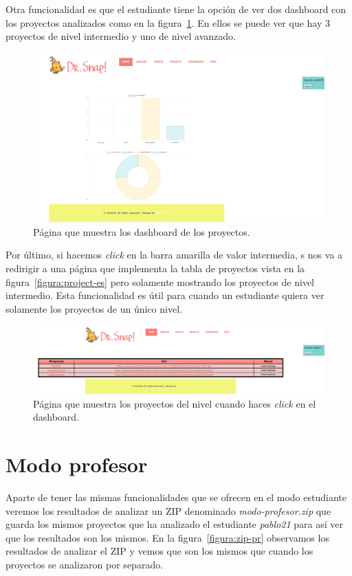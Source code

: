 \documentclass[a4paper, 12pt]{book}
\begin{document}
Otra funcionalidad es que el estudiante tiene la opción de ver dos dashboard con los proyectos analizados como en la figura~\ref{figura:dash-es}. En ellos se puede ver que hay 3 proyectos de nivel intermedio y uno de nivel avanzado.
\begin{figure}[h]
            \centering
           \includegraphics[scale=0.3]{img/dashboard-es.png}
            \caption{Página que muestra los dashboard de los proyectos.}
             \label{figura:dash-es}
        \end{figure}
        
Por último, si hacemos \textit{click} en la barra amarilla de valor intermedia, s nos va a redirigir a una página que implementa la tabla de proyectos vista en la figura~\ref{figura:project-es} pero solamente mostrando los proyectos de nivel intermedio. Esta funcionalidad es útil para cuando un estudiante quiera ver solamente los proyectos de un único nivel.
\begin{figure}[h]
            \centering
           \includegraphics[scale=0.3]{img/intermediate-es.png}
            \caption{Página que muestra los proyectos del nivel cuando haces \textit{click} en el dashboard.}
             \label{figura:click-es}
        \end{figure}
        
\section{Modo profesor}
Aparte de tener las mismas funcionalidades que se ofrecen en el modo estudiante veremos los resultados de analizar un ZIP denominado \textit{modo-profesor.zip} que guarda los mismos proyectos que ha analizado el estudiante \textit{pablo21} para así ver que los resultados son los mismos. En la figura~\ref{figura:zip-pr} observamos los resultados de analizar el ZIP y vemos que son los mismos que cuando los proyectos se analizaron por separado. 
\end{document}
